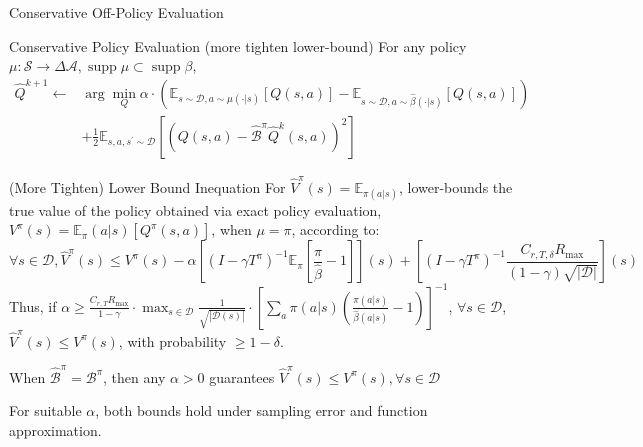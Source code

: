 \documentclass[11pt]{beamer}
\newcommand{\mbb}[1]{\mathbb{#1}}
\newcommand{\mc}[1]{\mathcal{#1}}
\newcommand{\abs}[1]{\left\lvert #1 \right\rvert}
\newcommand{\supp}{\operatorname{supp}}
\begin{document}
\begin{frame}{Conservative Off-Policy Evaluation}
  \begin{block}{Conservative Policy Evaluation (more tighten lower-bound)}
    For any policy $\mu : \mc{S} \to \Delta{\mc{A}}, \supp \mu \subset \supp \beta$,
    \[
    \begin{aligned}
      \hat{Q}^{k+1} \leftarrow &\arg \min_{Q} \alpha \cdot \left(\mbb{E}_{s \sim \mc{D}, a \sim \mu(\cdot|s)}[Q(s,a)] - \mbb{E}_{s \sim \mc{D}, a \sim \hat{\beta}(\cdot|s)} \left[Q(s,a)\right] \right) \\
      &+ \frac{1}{2} \mbb{E}_{s,a,s^\prime \sim \mc{D}} \left[ \left(Q(s,a) - \hat{\mc{B}}^\pi \hat{Q}^{k}(s,a)\right)^2\right]
  \end{aligned}
  \]
  \end{block}

  \begin{block}{(More Tighten) Lower Bound Inequation}
    For $\hat{V}^{\pi}(s) = \mbb{E}_{\pi(a|s)}$, lower-bounds the true value of the policy obtained via exact policy evaluation, $V^\pi(s) = \mbb{E}_{\pi}(a|s) [Q^\pi(s,a)]$, when $\mu=\pi$, according to:
    \[
      \forall s \in \mc{D}, \hat{V}^\pi (s) \leq V^\pi (s) - \alpha \left[(I - \gamma T^\pi)^{-1} \mbb{E}_\pi  \left[\frac{\pi}{\hat{\beta}} - 1\right]\right] (s) + \left[(I - \gamma T^\pi)^{-1} \frac{C_{r, T, \delta}R_{\text{max}}}{(1-\gamma)\sqrt{\abs{\mc{D}}}}\right](s)
    \]
    Thus, if $\alpha \geq \frac{C_{r,T}R_{\text{max}}}{1-\gamma} \cdot \max_{s\in \mc{D}}\frac{1}{\sqrt{\abs{\mc{D}(s)}}}\cdot \left[\sum_a \pi(a|s) (\frac{\pi(a|s)}{\hat{\beta}(a|s)}-1)\right]^{-1}$, $\forall s \in \mc{D}$, $\hat{V}^{\pi}(s) \leq V^\pi (s)$, with probability $\geq 1 - \delta$.

    When $\hat{\mc{B}}^\pi = \mc{B}^\pi$, then any $\alpha >0$ guarantees $\hat{V}^\pi (s) \leq V^{\pi} (s), \forall s \in \mc{D}$
  \end{block}
  For suitable $\alpha$, both bounds hold under sampling error and function approximation.

\end{frame}
\end{document}

